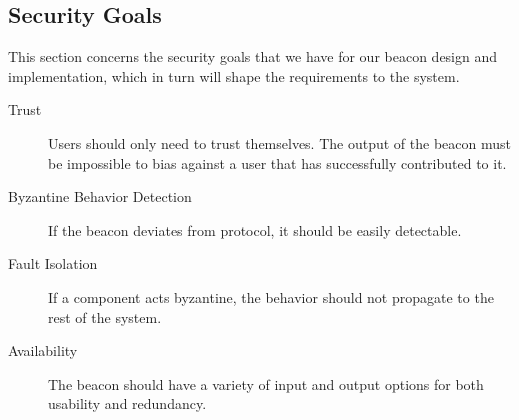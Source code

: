 \subsection{Security Goals}
This section concerns the security goals that we have for our beacon design and implementation, which in turn will shape the requirements to the system. 

\begin{description}
    \item [Trust] Users should only need to trust themselves. The output of the beacon must be impossible to bias against a user that has successfully contributed to it. 
    \item [Byzantine Behavior Detection] If the beacon deviates from protocol, it should be easily detectable.  
    \item [Fault Isolation] If a component acts byzantine, the behavior should not propagate to the rest of the system. 
    \item [Availability] The beacon should have a variety of input and output options for both usability and redundancy. 
\end{description}

